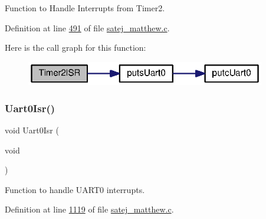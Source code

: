 Function to Handle Interrupts from Timer2. 



Definition at line \mbox{\hyperlink{satej__matthew_8c_source_l00491}{491}} of file \mbox{\hyperlink{satej__matthew_8c_source}{satej\+\_\+matthew.\+c}}.

Here is the call graph for this function\+:
\nopagebreak
\begin{figure}[H]
\begin{center}
\leavevmode
\includegraphics[width=296pt]{tm4c123gh6pm__startup__ccs_8c_a424b9010ddc61d3484dca1b6af5af5b0_cgraph}
\end{center}
\end{figure}
\mbox{\label{tm4c123gh6pm__startup__ccs_8c_affa7c2cc09d04fc57b05c5644b1c8a68}} 
\subsubsection{\texorpdfstring{Uart0Isr()}{Uart0Isr()}}
{\footnotesize\ttfamily void Uart0\+Isr (\begin{DoxyParamCaption}\item[{void}]{ }\end{DoxyParamCaption})}



Function to handle U\+A\+R\+T0 interrupts. 



Definition at line \mbox{\hyperlink{satej__matthew_8c_source_l01119}{1119}} of file \mbox{\hyperlink{satej__matthew_8c_source}{satej\+\_\+matthew.\+c}}.

